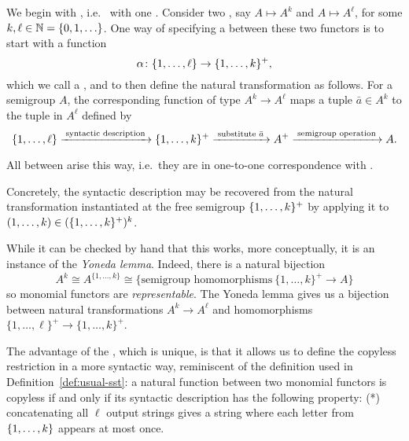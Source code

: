 \AP We begin with , i.e.~ with one . 
Consider two , say $A \mapsto A^k$ and $A \mapsto A^\ell$, for some  $k,\ell \in {\mathbb N} = \{0,1,\ldots\}$.
One way of specifying a  between these two functors is to start with a function 
\begin{equation}
\label{eq:syntactic-description}    \alpha\colon \{1,\ldots,\ell\} \to \{1,\ldots,k\}^+,
\end{equation}
which we call a , and to then  define the  natural transformation as follows. For a semigroup $A$, the corresponding function of type $A^k \to A^\ell$  maps a tuple $\bar a \in A^k$ to the tuple in $A^\ell$ defined by
\[
\{1,\ldots,\ell\}
\xrightarrow{\;\text{syntactic description}\;}
\{1,\ldots,k\}^+ 
\xrightarrow{\;\text{substitute $\bar a$}\;}
A^+
\xrightarrow{\;\text{semigroup operation}\;}
A.
\]
\begin{claim}\label{clm:monomial-yoneda}
  All  between  arise this
  way, i.e.~they are in one-to-one correspondence with .
\end{claim}
\begin{claimproof}
  Concretely, the syntactic description may be recovered from the natural
  transformation instantiated at the free semigroup $\{1,\ldots,k\}^+$ by applying it
  to $(1,\ldots,k)\in(\{1,\ldots,k\}^+)^k$.

  While it can be checked by hand that this works, more conceptually, it is an
  instance of the \emph{Yoneda lemma}. Indeed, there is a natural bijection
  \[ A^k \cong A^{\{1,\dots,k\}} \cong \{\text{semigroup homomorphisms}\
    \{1,\dots,k\}^+ \to A\} \]
  so monomial functors are \emph{representable}. The Yoneda lemma gives us a
  bijection between natural transformations $A^k \to A^\ell$ and homomorphisms
  $\{1,\dots,\ell\}^+ \to \{1,\dots,k\}^+$.
\end{claimproof}

 
The advantage of the , which is unique, is that it allows us to define the copyless restriction in a more syntactic way, reminiscent of the definition used in Definition~\ref{def:usual-sst}:  a natural function between two monomial functors is copyless if and only if its syntactic description has the following property: (*) concatenating all $\ell$ output strings gives a string where each letter from $\{1,\ldots,k\}$ appears at most once. 

